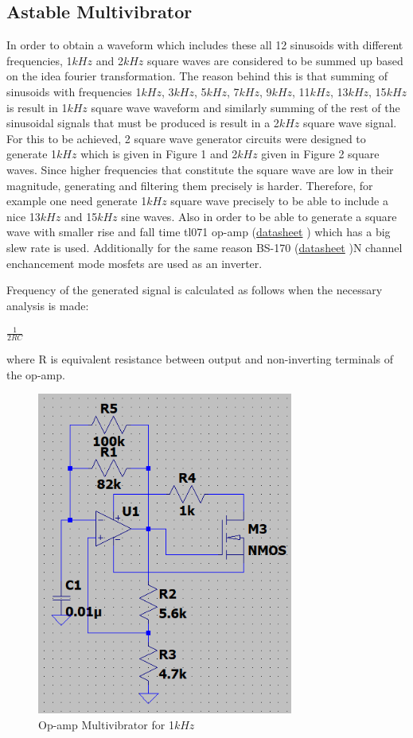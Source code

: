 \documentclass[letterpaper,12pt]{article}
\begin{document}
\subsection{Astable Multivibrator}
In order to obtain a waveform which includes these all 12 sinusoids with different frequencies, 1\(kHz\) and 2\(kHz\) square waves are considered to be summed up based on the idea fourier transformation. The reason behind this is that summing of sinusoids with frequencies 1\(kHz\), 3\(kHz\), 5\(kHz\), 7\(kHz\), 9\(kHz\), 11\(kHz\), 13\(kHz\), 15\(kHz\) is result in 1\(kHz\) square wave waveform and similarly summing of the rest of the sinusoidal signals that must be produced is result in a 2\(kHz\) square wave signal. For this to be achieved, 2 square wave generator circuits were designed to generate 1\(kHz\) which is given in Figure 1 and 2\(kHz\) given in Figure 2 square waves. Since higher frequencies that constitute the square wave are low in their magnitude, generating and filtering them precisely is harder. Therefore, for example one need generate 1\(kHz\) square wave precisely to be able to include a nice 13\(kHz\) and 15\(kHz\) sine waves.
Also in order to be able to generate a square wave with smaller rise and fall time tl071 op-amp (\href{https://www.st.com/resource/en/datasheet/tl071.pdf}{datasheet} ) which has a big slew rate is used. Additionally for the same reason BS-170 (\href{https://www.onsemi.com/pdf/datasheet/mmbf170-d.pdf}{datasheet} )N channel enchancement mode mosfets are used as an inverter.  

Frequency of the generated signal is calculated as follows when the necessary analysis is made:
\begin{center}
    $ \frac{1}{2RC} $
\end{center}
where R is equivalent resistance between output and non-inverting terminals of the op-amp.
\begin{figure}[H]
    \centering
    \includegraphics[width = 0.75\textwidth]{1K.png}
    \caption{Op-amp Multivibrator for 1\(kHz\)}
\end{figure} 
\end{document}
